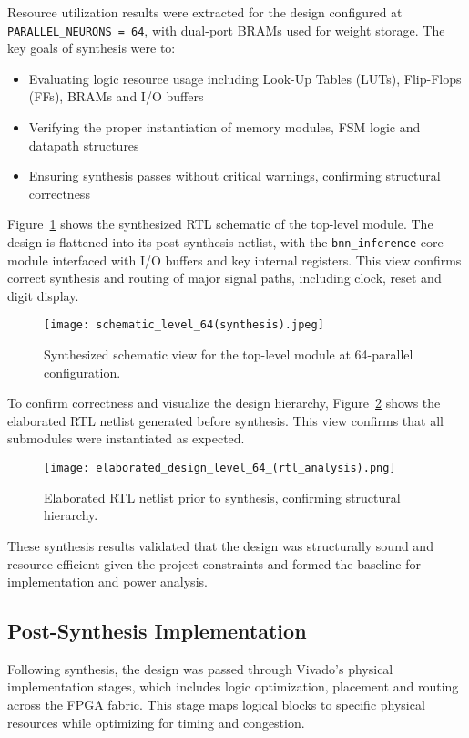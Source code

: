 \documentclass[a4paper,12pt]{report}
\begin{document}
Resource utilization results were extracted for the design configured at \texttt{PARALLEL\_NEURONS = 64}, with dual-port BRAMs used for weight storage. The key goals of synthesis were to:
\begin{itemize}
    \item Evaluating logic resource usage including Look-Up Tables (LUTs), Flip-Flops (FFs), BRAMs and I/O buffers
    \item Verifying the proper instantiation of memory modules, FSM logic and datapath structures
    \item Ensuring synthesis passes without critical warnings, confirming structural correctness
\end{itemize}
Figure~\ref{fig:synth_schematic} shows the synthesized RTL schematic of the top-level module. The design is flattened into its post-synthesis netlist, with the \texttt{bnn\_inference} core module interfaced with I/O buffers and key internal registers. This view confirms correct synthesis and routing of major signal paths, including clock, reset and digit display.
\begin{figure}[H]
    \centering
    \texttt{[image: schematic\_level\_64(synthesis).jpeg]}
    \caption{Synthesized schematic view for the top-level module at 64-parallel configuration.}
    \label{fig:synth_schematic}
\end{figure}

To confirm correctness and visualize the design hierarchy, Figure~\ref{fig:elab_rtl} shows the elaborated RTL netlist generated before synthesis. This view confirms that all submodules were instantiated as expected.

\begin{figure}[H]
    \centering
    \texttt{[image: elaborated\_design\_level\_64\_(rtl\_analysis).png]}
    \caption{Elaborated RTL netlist prior to synthesis, confirming structural hierarchy.}
    \label{fig:elab_rtl}
\end{figure}

These synthesis results validated that the design was structurally sound and resource-efficient given the project constraints and formed the baseline for implementation and power analysis.

\subsection{Post-Synthesis Implementation}
Following synthesis, the design was passed through Vivado's physical implementation stages, which includes logic optimization, placement and routing across the FPGA fabric. This stage maps logical blocks to specific physical resources while optimizing for timing and congestion.
\end{document}
